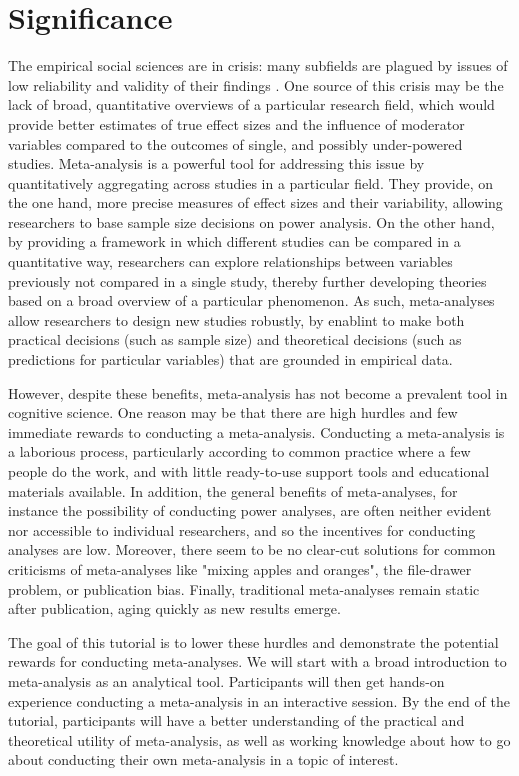 \documentclass[10pt,letterpaper]{article}
\begin{document}
\section{Significance}

The empirical social sciences are in crisis: many subfields are plagued by issues of low reliability and validity of their findings \cite{ioannidis2005most,open2013reproducibility,open2015estimating}. One source of this crisis may be the lack of broad, quantitative overviews of a particular research field, which would provide better estimates of true effect sizes and the influence of moderator variables compared to the outcomes of single, and possibly under-powered studies. Meta-analysis is a powerful tool for addressing this issue by quantitatively aggregating across studies in a particular field. They provide, on the one hand, more precise measures of effect sizes and their variability, allowing researchers to base sample size decisions on power analysis. On the other hand, by providing a framework in which different studies can be compared in a quantitative way, researchers can explore relationships between variables previously not compared in a single study, thereby further developing theories based on a broad overview of a particular phenomenon. As such, meta-analyses allow researchers to design new studies robustly, by enablint to make both practical decisions (such as sample size) and theoretical decisions (such as predictions for particular variables) that are grounded in empirical data.


However, despite these benefits, meta-analysis has not become a prevalent tool in cognitive science. One reason may be that there are high hurdles and few immediate rewards to conducting a meta-analysis. Conducting a meta-analysis is a laborious process, particularly according to common practice where a few people do the work, and with little ready-to-use support tools and educational materials available. In addition, the general benefits of meta-analyses, for instance the possibility of conducting power analyses, are often neither evident nor accessible to individual researchers, and so the incentives for conducting analyses are low. Moreover, there seem to be no clear-cut solutions for common criticisms of meta-analyses like "mixing apples and oranges", the file-drawer problem, or publication bias. Finally, traditional meta-analyses remain static after publication, aging quickly as new results emerge.

The goal of this tutorial is to lower these hurdles and demonstrate the potential rewards for conducting meta-analyses. We will start with a broad introduction to meta-analysis as an analytical tool. Participants will then get hands-on experience conducting a meta-analysis in an interactive session. By the end of the tutorial,  participants  will have a better understanding of the practical and theoretical utility of meta-analysis, as well as working knowledge about how to go about conducting their own meta-analysis in a topic of interest.
\end{document}
